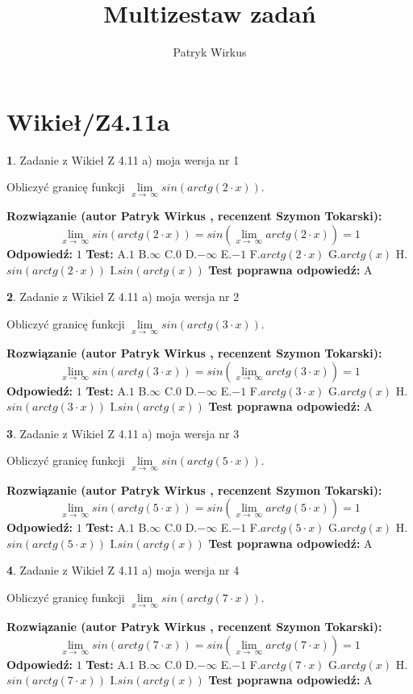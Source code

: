 \documentclass[12pt, a4paper]{article}
\title{Multizestaw zadań}
\author{Patryk Wirkus}
\date{}
\theoremstyle{definition} %
\newtheorem{zad}{}
\newcommand{\kategoria}[1]{\section{#1}}
\newcommand{\zadStart}[1]{\begin{zad}#1\newline}
\newcommand{\zadStop}{\end{zad}}
\newcommand{\rozwStart}[2]{\noindent \textbf{Rozwiązanie (autor #1 , recenzent #2): }\newline}
\newcommand{\rozwStop}{\newline}
\newcommand{\odpStart}{\noindent \textbf{Odpowiedź:}\newline}
\newcommand{\odpStop}{\newline}
\newcommand{\testStart}{\noindent \textbf{Test:}\newline}
\newcommand{\testStop}{\newline}
\newcommand{\kluczStart}{\noindent \textbf{Test poprawna odpowiedź:}\newline}
\newcommand{\kluczStop}{\newline}
\begin{document}
\maketitle

\kategoria{Wikieł/Z4.11a}


\zadStart{Zadanie z Wikieł Z 4.11 a) moja wersja nr 1}

Obliczyć granicę funkcji  $\lim\limits_{x\to\ \infty}sin(arctg(2\cdot x))$.
\zadStop
\rozwStart{Patryk Wirkus}{Szymon Tokarski}
$$\lim\limits_{x\to\ \infty}sin(arctg(2\cdot x)) = sin(\lim\limits_{x\to\ \infty}arctg(2\cdot x)) = 1$$
\rozwStop
\odpStart
$1$
\odpStop
\testStart
A.$1$ B.$\infty$ C.$0$ D.$-\infty$ E.$-1$
F.$arctg(2\cdot x)$ G.$arctg(x)$
H.$sin(arctg(2\cdot x))$
I.$sin(arctg(x))$
\testStop
\kluczStart
A
\kluczStop



\zadStart{Zadanie z Wikieł Z 4.11 a) moja wersja nr 2}

Obliczyć granicę funkcji  $\lim\limits_{x\to\ \infty}sin(arctg(3\cdot x))$.
\zadStop
\rozwStart{Patryk Wirkus}{Szymon Tokarski}
$$\lim\limits_{x\to\ \infty}sin(arctg(3\cdot x)) = sin(\lim\limits_{x\to\ \infty}arctg(3\cdot x)) = 1$$
\rozwStop
\odpStart
$1$
\odpStop
\testStart
A.$1$ B.$\infty$ C.$0$ D.$-\infty$ E.$-1$
F.$arctg(3\cdot x)$ G.$arctg(x)$
H.$sin(arctg(3\cdot x))$
I.$sin(arctg(x))$
\testStop
\kluczStart
A
\kluczStop



\zadStart{Zadanie z Wikieł Z 4.11 a) moja wersja nr 3}

Obliczyć granicę funkcji  $\lim\limits_{x\to\ \infty}sin(arctg(5\cdot x))$.
\zadStop
\rozwStart{Patryk Wirkus}{Szymon Tokarski}
$$\lim\limits_{x\to\ \infty}sin(arctg(5\cdot x)) = sin(\lim\limits_{x\to\ \infty}arctg(5\cdot x)) = 1$$
\rozwStop
\odpStart
$1$
\odpStop
\testStart
A.$1$ B.$\infty$ C.$0$ D.$-\infty$ E.$-1$
F.$arctg(5\cdot x)$ G.$arctg(x)$
H.$sin(arctg(5\cdot x))$
I.$sin(arctg(x))$
\testStop
\kluczStart
A
\kluczStop



\zadStart{Zadanie z Wikieł Z 4.11 a) moja wersja nr 4}

Obliczyć granicę funkcji  $\lim\limits_{x\to\ \infty}sin(arctg(7\cdot x))$.
\zadStop
\rozwStart{Patryk Wirkus}{Szymon Tokarski}
$$\lim\limits_{x\to\ \infty}sin(arctg(7\cdot x)) = sin(\lim\limits_{x\to\ \infty}arctg(7\cdot x)) = 1$$
\rozwStop
\odpStart
$1$
\odpStop
\testStart
A.$1$ B.$\infty$ C.$0$ D.$-\infty$ E.$-1$
F.$arctg(7\cdot x)$ G.$arctg(x)$
H.$sin(arctg(7\cdot x))$
I.$sin(arctg(x))$
\testStop
\kluczStart
A
\kluczStop
\end{document}
